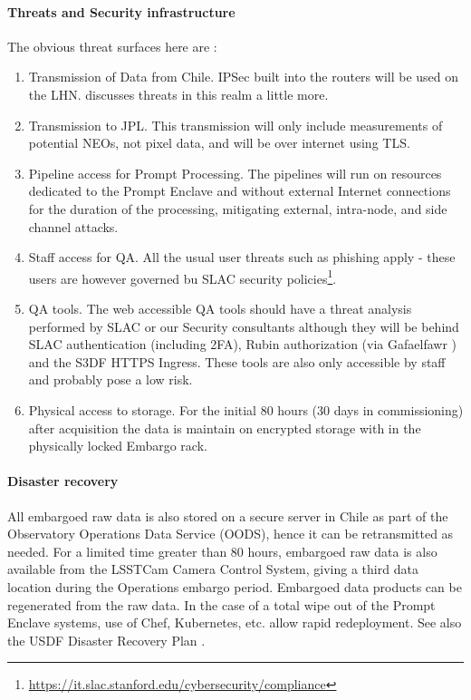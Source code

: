 \paragraph{ Threats and Security infrastructure}
The obvious threat surfaces here are :
\begin{enumerate}
\item Transmission of Data from Chile. IPSec built into the routers will be used on the \gls{LHN}.  discusses threats in this realm a little more.
\item Transmission to \gls{JPL}.  This transmission will only include measurements of potential NEOs, not pixel data, and will be over internet using TLS.
\item Pipeline access for Prompt Processing. The pipelines will run on resources dedicated to the Prompt Enclave and without external Internet connections for the duration of the processing, mitigating external, intra-node, and side channel attacks.
\item Staff access for \gls{QA}. All the usual user threats such as phishing apply - these users are however governed bu SLAC security policies\footnote{\url{https://it.slac.stanford.edu/cybersecurity/compliance}}.
\item QA tools. The web accessible QA tools should have a threat analysis performed by SLAC or our Security consultants although they will be behind SLAC authentication (including 2FA), Rubin authorization (via Gafaelfawr ) and the S3DF HTTPS Ingress. These tools are also only accessible by staff and probably pose a low risk.
\item Physical access to storage.  For the initial 80 hours (30 days in commissioning) after acquisition the data is maintain on encrypted storage with in the physically locked Embargo rack.
\end{enumerate}

\paragraph{Disaster recovery}
All embargoed raw data is also stored on a secure server in Chile as part of the Observatory Operations Data Service (OODS), hence it can be retransmitted as needed.
For a limited time greater than 80 hours, embargoed raw data is also available from the LSSTCam Camera Control System, giving a third data location during the Operations embargo period.
Embargoed data products can be regenerated from the raw data.
In the case of a total wipe out of the Prompt Enclave systems, use of Chef, Kubernetes, etc. allow rapid redeployment.
See also the USDF Disaster Recovery Plan .

